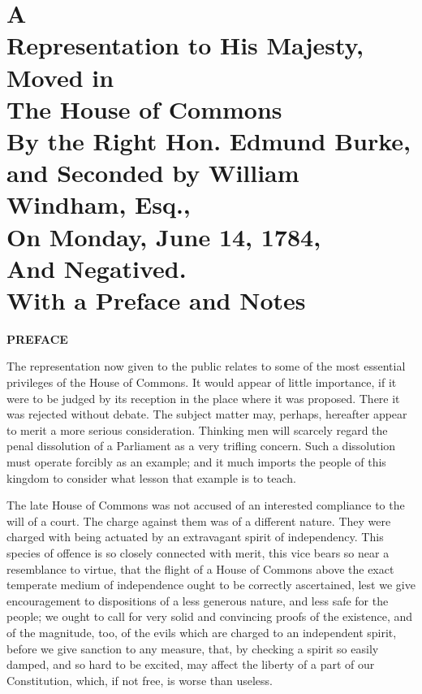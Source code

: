 






\chapter*[A Representation to His Majesty]{
A
\\Representation to His Majesty,
\\Moved in
\\The House of Commons
\\By the Right Hon. Edmund Burke, and Seconded by William Windham, Esq.,
\\On Monday, June 14, 1784,
\\And Negatived.
\\With a Preface and Notes}

\begin{center}
  \textbf{\large PREFACE} \par 
\end{center}

The representation now given to the public relates to some of the most essential privileges of the House of Commons. It would appear of little importance, if it were to be judged by its reception in the place where it was proposed. There it was rejected without debate. The subject matter may, perhaps, hereafter appear to merit a more serious consideration. Thinking men will scarcely regard the penal dissolution of a Parliament as a very trifling concern. Such a dissolution must operate forcibly as an example; and it much imports the people of this kingdom to consider what lesson that example is to teach.

The late House of Commons was not accused of an interested compliance to the will of a court. The charge against them was of a different nature. They were charged with being actuated by an extravagant spirit of independency. This species of offence is so closely connected with merit, this vice bears so near a resemblance to virtue, that the flight of a House of Commons above the exact temperate medium of independence ought to be correctly ascertained, lest we give encouragement to dispositions of a less generous nature, and less safe for the people; we ought to call for very solid and convincing proofs of the existence, and of the magnitude, too, of the evils which are charged to an independent spirit, before we give sanction to any measure, that, by checking a spirit so easily damped, and so hard to be excited, may affect the liberty of a part of our Constitution, which, if not free, is worse than useless.

